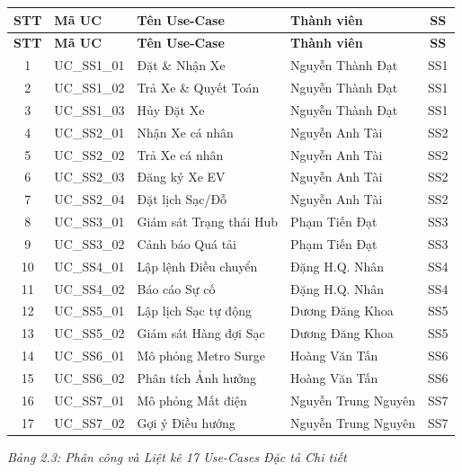 \documentclass[12pt,a4paper]{report}
\begin{document}
\renewcommand{\arraystretch}{1.4}
\begin{longtable}{|c|l|l|l|c|}
    \hline
    \textbf{STT} & \textbf{Mã UC} & \textbf{Tên Use-Case} & \textbf{Thành viên} & \textbf{SS} \\
    \hline
    \endfirsthead
    \hline
    \textbf{STT} & \textbf{Mã UC} & \textbf{Tên Use-Case} & \textbf{Thành viên} & \textbf{SS} \\
    \hline
    \endhead

    1 & UC\_SS1\_01 & Đặt \& Nhận Xe & Nguyễn Thành Đạt & SS1 \\
    \hline
    2 & UC\_SS1\_02 & Trả Xe \& Quyết Toán & Nguyễn Thành Đạt & SS1 \\
    \hline
    3 & UC\_SS1\_03 & Hủy Đặt Xe & Nguyễn Thành Đạt & SS1 \\
    \hline
    4 & UC\_SS2\_01 & Nhận Xe cá nhân & Nguyễn Anh Tài & SS2 \\
    \hline
    5 & UC\_SS2\_02 & Trả Xe cá nhân & Nguyễn Anh Tài & SS2 \\
    \hline
    6 & UC\_SS2\_03 & Đăng ký Xe EV & Nguyễn Anh Tài & SS2 \\
    \hline
    7 & UC\_SS2\_04 & Đặt lịch Sạc/Đỗ & Nguyễn Anh Tài & SS2 \\
    \hline
    8 & UC\_SS3\_01 & Giám sát Trạng thái Hub & Phạm Tiến Đạt & SS3 \\
    \hline
    9 & UC\_SS3\_02 & Cảnh báo Quá tải & Phạm Tiến Đạt & SS3 \\
    \hline
    10 & UC\_SS4\_01 & Lập lệnh Điều chuyển & Đặng H.Q. Nhân & SS4 \\
    \hline
    11 & UC\_SS4\_02 & Báo cáo Sự cố & Đặng H.Q. Nhân & SS4 \\
    \hline
    12 & UC\_SS5\_01 & Lập lịch Sạc tự động & Dương Đăng Khoa & SS5 \\
    \hline
    13 & UC\_SS5\_02 & Giám sát Hàng đợi Sạc & Dương Đăng Khoa & SS5 \\
    \hline
    14 & UC\_SS6\_01 & Mô phỏng Metro Surge & Hoàng Văn Tấn & SS6 \\
    \hline
    15 & UC\_SS6\_02 & Phân tích Ảnh hưởng & Hoàng Văn Tấn & SS6 \\
    \hline
    16 & UC\_SS7\_01 & Mô phỏng Mất điện & Nguyễn Trung Nguyên & SS7 \\
    \hline
    17 & UC\_SS7\_02 & Gợi ý Điều hướng & Nguyễn Trung Nguyên & SS7 \\
    \hline
\end{longtable}
\begin{center}\textit{Bảng 2.3: Phân công và Liệt kê 17 Use-Cases Đặc tả Chi tiết}\end{center}
\vspace{0.5cm}
\end{document}
